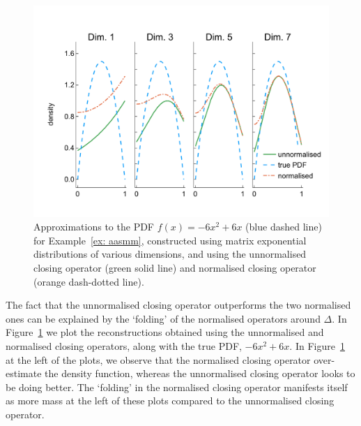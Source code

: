 \begin{example}
	\begin{figure}[h]
		\centering
		\includegraphics[width=\textwidth,trim={0cm 1.25cm 0cm 1.25cm},clip]{chapter6/figs/qbdrap_closing_vec/fun6/pdfs_formatted.pdf}
		\caption{Approximations to the PDF \(f(x)=-6x^2+6x\) (blue dashed line) for Example~\ref{ex: aasmm}, constructed using matrix exponential distributions of various dimensions, and using the unnormalised closing operator (green solid line) and normalised closing operator (orange dash-dotted line).} 
		\label{fig: pdf reconstructed quadratic}
	\end{figure} 
The fact that the unnormalised closing operator outperforms the two normalised ones can be explained by the `folding' of the normalised operators around \(\Delta\). In Figure~\ref{fig: pdf reconstructed quadratic} we plot the reconstructions obtained using the unnormalised and normalised closing operators, along with the true PDF, \(-6x^2+6x\). In Figure~\ref{fig: pdf reconstructed quadratic} at the left of the plots, we observe that the normalised closing operator over-estimate the density function, whereas the unnormalised closing operator looks to be doing better. The `folding' in the normalised closing operator manifests itself as more mass at the left of these plots compared to the unnormalised closing operator. 
\end{example}

